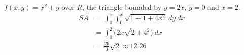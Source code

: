 {$f(x,y) = x^2+y$ over $R$, the triangle bounded by $y=2x$, $y=0$ and $x=2$.
}
{
\begin{align*}SA &= \int_{0}^{x}\int_{0}^{x} \sqrt{1+ 1+4x^2}\ dy\ dx\\
		&= \int_0^{2}\big(2x\sqrt{2+4^2}\big)\ dx \\
		&= \frac{26}{3}\sqrt{2}\approx 12.26
\end{align*}
}